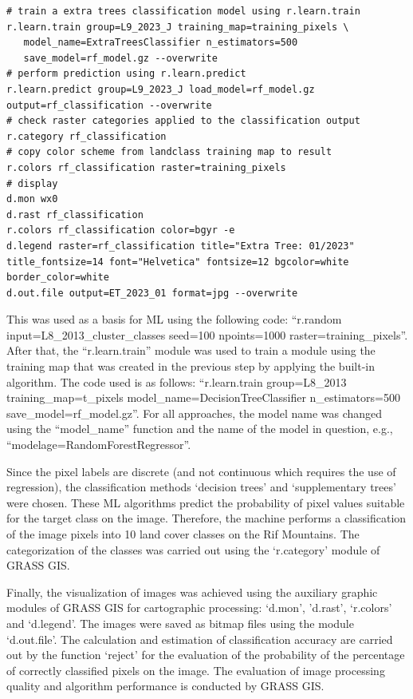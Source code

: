 \documentclass[geomatics,article,accept,pdftex,oneauthor]{Definitions/mdpi}
\begin{document}
\begin{footnotesize}
\begin{verbatim}
# train a extra trees classification model using r.learn.train
r.learn.train group=L9_2023_J training_map=training_pixels \
   model_name=ExtraTreesClassifier n_estimators=500 
   save_model=rf_model.gz --overwrite
# perform prediction using r.learn.predict
r.learn.predict group=L9_2023_J load_model=rf_model.gz  output=rf_classification --overwrite
# check raster categories applied to the classification output
r.category rf_classification
# copy color scheme from landclass training map to result
r.colors rf_classification raster=training_pixels
# display
d.mon wx0
d.rast rf_classification
r.colors rf_classification color=bgyr -e
d.legend raster=rf_classification title="Extra Tree: 01/2023" 
title_fontsize=14 font="Helvetica" fontsize=12 bgcolor=white 
border_color=white
d.out.file output=ET_2023_01 format=jpg --overwrite
\end{verbatim}
\end{footnotesize}

This was used as a basis for ML using the following code: “r.random input=L8\_2013\_cl\linebreak  uster\_classes seed=100 npoints=1000 raster=training\_pixels”. After that, the “r.learn.train” module was used to train a module using the training map that was created in the previous step by applying the built-in algorithm. The code used is as follows: “r.learn.train group=L8\_2013 training\_map=t\_pixels model\_name=DecisionTreeClassifier n\_estimators=500 save\_model=rf\_model.gz”. For all approaches, the model name was changed using the “model\_name” function and the name of the model in question, e.g., “modelage=RandomForestRegressor”.

Since the pixel labels are discrete (and not continuous which requires the use of regression), the classification methods `decision trees' and `supplementary trees' were chosen. These ML algorithms predict the probability of pixel values suitable for the target class on the image. Therefore, the machine performs a classification of the image pixels into 10 land cover classes on the Rif Mountains. The categorization of the classes was carried out using the `r.category' module of GRASS GIS. 

Finally, the visualization of images was achieved using the auxiliary graphic modules of GRASS GIS for cartographic processing: `d.mon', 'd.rast', `r.colors' and `d.legend'. The images were saved as bitmap files using the module `d.out.file'. The calculation and estimation of classification accuracy are carried out by the function `reject' for the evaluation of the probability of the percentage of correctly classified pixels on the image. The evaluation of image processing quality and algorithm performance is conducted by GRASS GIS.
\end{document}
